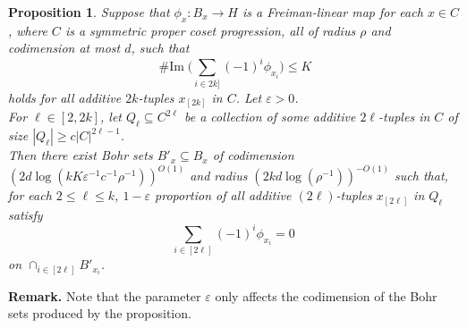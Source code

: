 \documentclass[a4paper,11pt]{article}
\numberwithin{theorem}{section}
\newtheorem{proposition}[theorem]{Proposition}
\theoremstyle{definition}
\newcommand{\on}[1]{
	\operatorname{#1}
}
\newcommand\range{\on{\# Im}}
\begin{document}
\begin{proposition}\label{changeofperspectivestep1}
    Suppose that $\phi_x : B_x \to H$ is a Freiman-linear map for each $x \in C$, where $C$ is a symmetric proper coset progression, all of radius $\rho$ and codimension at most $d$, such that
    \[\range\Big(\sum_{i \in 2k]} (-1)^i \phi_{x_i}\Big) \leq K\]
    holds for all additive $2k$-tuples $x_{[2k]}$ in $C$. Let $\varepsilon > 0$. \\
    \indent For $\ell \in [2,2k]$, let $Q_\ell \subseteq C^{2\ell}$ be a collection of some additive $2\ell$-tuples in $C$ of size $|Q_\ell| \geq c |C|^{2\ell - 1}$.\\
    \indent Then there exist Bohr sets $B'_x \subseteq B_x$ of codimension $(2d\log(k K\varepsilon^{-1} c^{-1}\rho^{-1}))^{O(1)}$ and radius $(2k d\log(\rho^{-1}))^{-O(1)}$ such that, for each $2\leq \ell \leq k$, $1-\varepsilon$ proportion of all additive $(2\ell)$-tuples $x_{[2\ell]}$ in $Q_\ell$  satisfy
         \[\sum_{i \in [2\ell]} (-1)^i \phi_{x_i} = 0\]
    on $\cap_{i \in [2\ell]} B'_{x_i}$.
\end{proposition}


\noindent\textbf{Remark.} Note that the parameter $\varepsilon$ only affects the codimension of the Bohr sets produced by the proposition.

    
\end{document}

